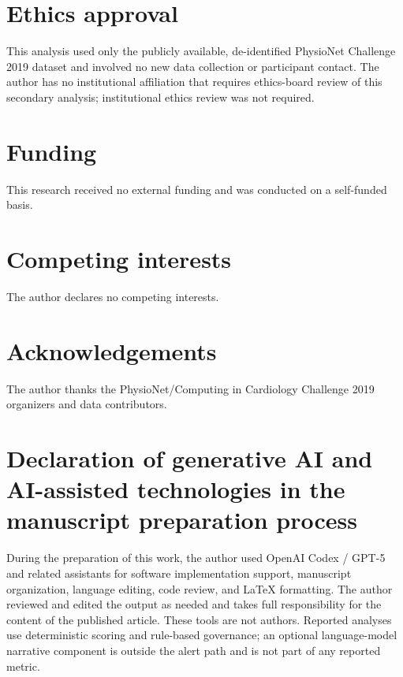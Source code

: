 \documentclass[11pt]{article}
\begin{document}
\section*{Ethics approval}
This analysis used only the publicly available, de-identified PhysioNet
Challenge 2019 dataset and involved no new data collection or participant
contact. The author has no institutional affiliation that requires ethics-board
review of this secondary analysis; institutional ethics review was not required.

\section*{Funding}
This research received no external funding and was conducted on a self-funded basis.

\section*{Competing interests}
The author declares no competing interests.

\section*{Acknowledgements}
The author thanks the PhysioNet/Computing in Cardiology Challenge 2019
organizers and data contributors.

\section*{Declaration of generative AI and AI-assisted technologies in the
manuscript preparation process}
During the preparation of this work, the author used OpenAI Codex / GPT-5 and
related assistants for software implementation support, manuscript organization,
language editing, code review, and \LaTeX{} formatting. The author reviewed and
edited the output as needed and takes full responsibility for the content of the
published article. These tools are not authors. Reported analyses use
deterministic scoring and rule-based governance; an optional language-model
narrative component is outside the alert path and is not part of any reported
metric.
\end{document}
